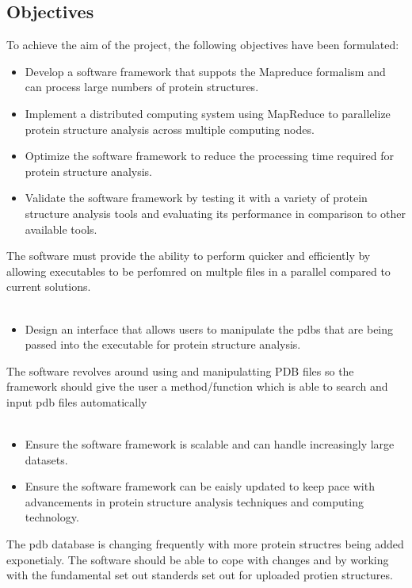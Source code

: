 \documentclass[]{final_report}
\begin{document}
\subsection{Objectives}

To achieve the aim of the project, the following objectives have been formulated:

\begin{itemize}
    \item Develop a software framework that suppots the Mapreduce formalism and can process large numbers of protein structures.
    \item Implement a distributed computing system using MapReduce to parallelize protein structure analysis across multiple computing nodes.
    \item Optimize the software framework to reduce the processing time required for protein structure analysis.
    \item Validate the software framework by testing it with a variety of protein structure analysis tools and evaluating its performance in comparison to other available tools.
\end{itemize}
The software must provide the ability to perform quicker and efficiently by allowing executables to be perfomred on multple files in a parallel compared to current solutions.\\\\

\begin{itemize}
    \item Design an interface that allows users to manipulate the pdbs that are being passed into the executable for protein structure analysis.
\end{itemize}
The software revolves around using and manipulatting PDB files so the framework should give the user a method/function which is able to search and input pdb files automatically\\\\

\begin{itemize}
    \item Ensure the software framework is scalable and can handle increasingly large datasets.
    \item Ensure the software framework can be eaisly updated to keep pace with advancements in protein structure analysis techniques and computing technology.
\end{itemize}
The pdb database is changing frequently with more protein structres being added exponetialy. The software should be able to cope with changes and by working with the fundamental set out standerds set out for uploaded protien structures.\\\\
\end{document}
